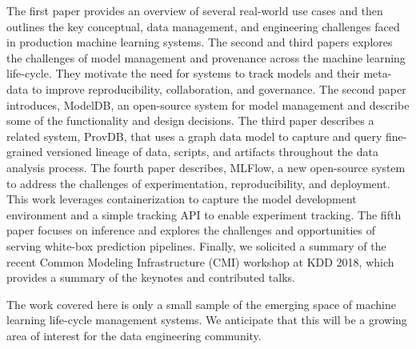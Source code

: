\documentclass[11pt]{article}
\begin{document}
The first paper provides an overview of several real-world use cases and then outlines the key conceptual, data management, and engineering challenges faced in production machine learning systems.
The second and third papers explores the challenges of model management and provenance across the machine learning life-cycle.
They motivate the need for systems to track models and their meta-data to improve reproducibility, collaboration, and governance. 
The second paper introduces, ModelDB, an open-source system for model management and describe some of the functionality and design decisions. 
The third paper describes a related system, ProvDB, that uses a graph data model to capture and query fine-grained versioned lineage of data, scripts, and artifacts throughout the data analysis process.
The fourth paper describes, MLFlow, a new open-source system to address the challenges of experimentation, reproducibility, and deployment. 
This work leverages containerization to capture the model development environment and a simple tracking API to enable experiment tracking.
The fifth paper focuses on inference and explores the challenges and opportunities of serving white-box prediction pipelines.  
Finally, we solicited a summary of the recent Common Modeling Infrastructure (CMI) workshop at KDD 2018, which provides a summary of the keynotes and contributed talks.

The work covered here is only a small sample of the emerging space of machine learning life-cycle management systems. 
We anticipate that this will be a growing area of interest for the data engineering community.


\end{document}
